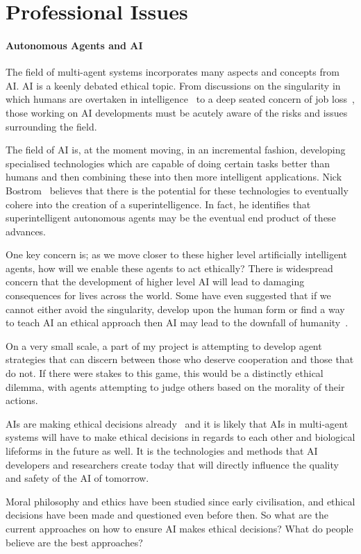 \documentclass[]{final_report}
\begin{document}
\newpage
{}

\label{endpage}

\chapter{Professional Issues}

\subsubsection{Autonomous Agents and AI}
The field of multi-agent systems incorporates many aspects and concepts from AI. AI is a keenly debated ethical topic. From discussions on the singularity in which humans are overtaken in intelligence~\cite{bostrom2003ethical} to a deep seated concern of job loss~\cite{smith2014ai}, those working on AI developments must be acutely aware of the risks and issues surrounding the field.\par 
The field of AI is, at the moment moving, in an incremental fashion, developing specialised technologies which are capable of doing certain tasks better than humans and then combining these into then more intelligent applications. Nick Bostrom~\cite{bostrom2003ethical} believes that there is the potential for these technologies to eventually cohere into the creation of a superintelligence. In fact, he identifies that superintelligent autonomous agents may be the eventual end product of these advances.\par 
One key concern is; as we move closer to these higher level artificially intelligent agents, how will we enable these agents to act ethically? There is widespread concern that the development of higher level AI will lead to damaging consequences for lives across the world. Some have even suggested that if we cannot either avoid the singularity, develop upon the human form or find a way to teach AI an ethical approach then AI may lead to the downfall of humanity~\cite{vinge1993coming}.\par 
On a very small scale, a part of my project is attempting to develop agent strategies that can discern between those who deserve cooperation and those that do not. If there were stakes to this game, this would be a distinctly ethical dilemma, with agents attempting to judge others based on the morality of their actions.\par 
AIs are making ethical decisions already~\cite{watsoncancer} and it is likely that AIs in multi-agent systems will have to make ethical decisions in regards to each other and biological lifeforms in the future as well. It is the technologies and methods that AI developers and researchers create today that will directly influence the quality and safety of the AI of tomorrow.\par 
Moral philosophy and ethics have been studied since early civilisation, and ethical decisions have been made and questioned even before then. So what are the current approaches on how to ensure AI makes ethical decisions? What do people believe are the best approaches?
\end{document}
